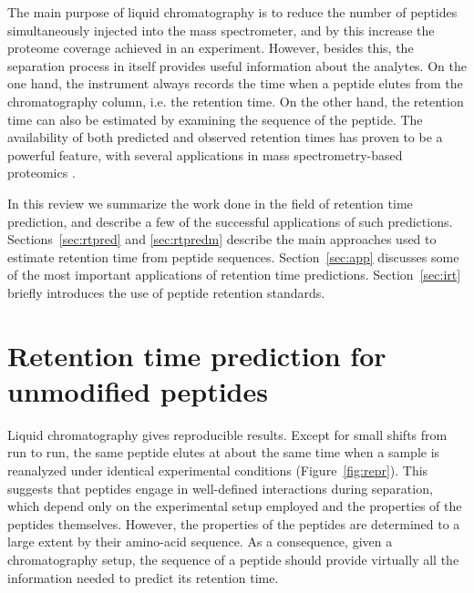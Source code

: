 \documentclass[a4paper]{article}
\begin{document}
The main purpose of liquid chromatography is to reduce the number of
peptides simultaneously injected into the mass spectrometer, and by
this increase the proteome coverage achieved in an experiment.
However, besides this, the separation process in itself provides
useful information about the analytes. On the one hand, the instrument
always records the time when a peptide elutes from the chromatography
column, i.e. the retention time. On the other hand, the retention time
can also be estimated by examining the sequence of the peptide. The
availability of both predicted and observed retention times has proven
to be a powerful feature, with several applications in mass
spectrometry-based proteomics \cite{Palmblad2013}.  


In this review we summarize the work done in the field of retention
time prediction, and describe a few of the successful applications of
such predictions. Sections~\ref{sec:rtpred} and \ref{sec:rtpredm}
describe the main approaches used to estimate retention time from
peptide sequences. Section~\ref{sec:app} discusses some of the most
important applications of retention time predictions.
Section~\ref{sec:irt} briefly introduces the use of peptide retention
standards.


\section{\label{sec:rtpred}Retention time prediction for unmodified peptides}


Liquid chromatography gives reproducible results. Except for small
shifts from run to run, the same peptide elutes at about the same time
when a sample is reanalyzed under identical experimental conditions
(Figure~\ref{fig:repr}). This suggests that peptides engage in
well-defined interactions during separation, which depend only on the
experimental setup employed and the properties of the peptides
themselves. However, the properties of the peptides are determined to
a large extent by their amino-acid sequence. As a consequence, given a
chromatography setup, the sequence of a peptide should provide
virtually all the information needed to predict its retention time.
\end{document}
